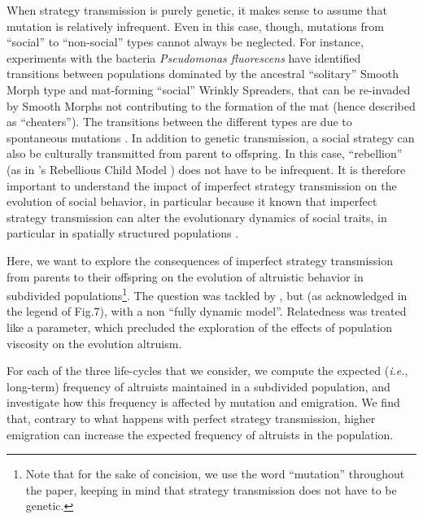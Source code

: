 \documentclass[11pt, letterpaper]{article}
\newcommand{\ie}{\textit{i.e.}}
\newcommand{\eg}{\textit{e.g.}}
\begin{document}
When strategy transmission is purely genetic, it makes sense to assume that mutation is relatively infrequent. Even in this case, though, mutations from ``social'' to ``non-social'' types cannot always be neglected. For instance, experiments with the bacteria \textit{Pseudomonas fluorescens} have identified transitions between populations dominated by the ancestral ``solitary'' Smooth Morph type and mat-forming ``social'' Wrinkly Spreaders, that can be re-invaded by Smooth Morphs not contributing to the formation of the mat (hence described as ``cheaters''). The transitions between the different types are due to spontaneous mutations \citep{Hammerschmidt2014}. In addition to genetic transmission, a social strategy can also be culturally transmitted from parent to offspring. In this case, ``rebellion'' (as in \citeauthor{Frank1997}'s Rebellious Child Model \citep{Frank1997}) does not have to be infrequent. It is therefore important to understand the impact of imperfect strategy transmission on the evolution of social behavior, in particular because it known that imperfect strategy transmission can alter the evolutionary dynamics of social traits, in particular in spatially structured populations \citep[see \eg,][for graph-structured populations]{Allen2012,Debarre2017}. 

Here, we want to explore the consequences of imperfect strategy transmission from parents to their offspring on the evolution of altruistic behavior in subdivided populations\footnote{Note that for the sake of concision, we use the word ``mutation'' throughout the paper, keeping in mind that strategy transmission does not have to be genetic. }. The question was tackled by \citet{Frank1997}, but (as acknowledged in the legend of Fig.7), with a non ``fully dynamic model''. Relatedness was treated like a parameter, which precluded the exploration of the effects of population viscosity on the evolution altruism. 

For each of the three life-cycles that we consider, we compute the expected (\ie, long-term) frequency of altruists maintained in a subdivided population, and investigate how this frequency is affected by mutation and emigration. We find that, contrary to what happens with perfect strategy transmission, higher emigration can increase the expected frequency of altruists in the population. 
\end{document}
